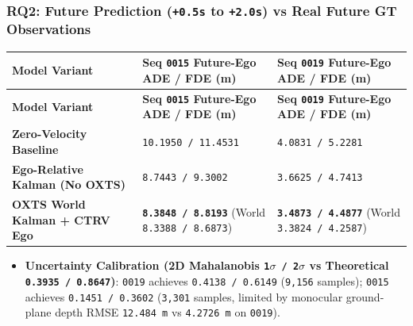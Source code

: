 \documentclass[10.5pt,a4paper]{article}
\begin{document}
\subsubsection{RQ2: Future Prediction (\texttt{+0.\allowbreak{}5s} to \texttt{+2.\allowbreak{}0s}) vs Real Future GT Observations}

\begin{footnotesize}
\setlength{\tabcolsep}{4pt}
\setlength{\LTleft}{0pt}\setlength{\LTright}{0pt}
\begin{longtable}{>{\raggedright\arraybackslash}p{} >{\raggedright\arraybackslash}p{} >{\raggedright\arraybackslash}p{}}
\toprule
\textbf{Model Variant} & \textbf{Seq \texttt{0015} Future-Ego ADE / FDE (m)} & \textbf{Seq \texttt{0019} Future-Ego ADE / FDE (m)} \\
\midrule
\endfirsthead
\toprule
\textbf{Model Variant} & \textbf{Seq \texttt{0015} Future-Ego ADE / FDE (m)} & \textbf{Seq \texttt{0019} Future-Ego ADE / FDE (m)} \\
\midrule
\endhead
\bottomrule
\endfoot
\textbf{Zero-Velocity Baseline} & \texttt{10.\allowbreak{}1950 /\allowbreak{} 11.\allowbreak{}4531} & \texttt{4.\allowbreak{}0831 /\allowbreak{} 5.\allowbreak{}2281} \\
\textbf{Ego-Relative Kalman (No OXTS)} & \texttt{8.\allowbreak{}7443 /\allowbreak{} 9.\allowbreak{}3002} & \texttt{3.\allowbreak{}6625 /\allowbreak{} 4.\allowbreak{}7413} \\
\textbf{OXTS World Kalman + CTRV Ego} & \textbf{\texttt{8.\allowbreak{}3848 /\allowbreak{} 8.\allowbreak{}8193}} (World \texttt{8.\allowbreak{}3388 /\allowbreak{} 8.\allowbreak{}6873}) & \textbf{\texttt{3.\allowbreak{}4873 /\allowbreak{} 4.\allowbreak{}4877}} (World \texttt{3.\allowbreak{}3824 /\allowbreak{} 4.\allowbreak{}2587}) \\
\end{longtable}
\end{footnotesize}


\begin{itemize}[leftmargin=1.5em,itemsep=2pt]
\item \textbf{Uncertainty Calibration (2D Mahalanobis \texttt{1$\sigma$ /\allowbreak{} 2$\sigma$} vs Theoretical \texttt{0.\allowbreak{}3935 /\allowbreak{} 0.\allowbreak{}8647})}: \texttt{0019} achieves \texttt{0.\allowbreak{}4138 /\allowbreak{} 0.\allowbreak{}6149} (\texttt{9,\allowbreak{}156} samples); \texttt{0015} achieves \texttt{0.\allowbreak{}1451 /\allowbreak{} 0.\allowbreak{}3602} (\texttt{3,\allowbreak{}301} samples, limited by monocular ground-plane depth RMSE \texttt{12.\allowbreak{}484 m} vs \texttt{4.\allowbreak{}2726 m} on \texttt{0019}).
\end{itemize}
\end{document}
